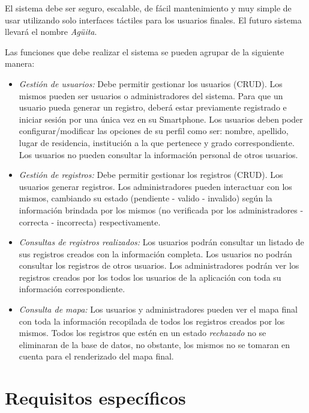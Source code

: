       El sistema debe ser seguro, escalable, de fácil mantenimiento y muy simple de usar utilizando solo interfaces táctiles para los usuarios finales. El futuro sistema llevará el nombre \emph{Agüita}.

      Las funciones que debe realizar el sistema se pueden agrupar de la siguiente manera:

      \begin{itemize}

        \item \emph{Gestión de usuarios:} Debe permitir gestionar los usuarios (CRUD). Los mismos pueden ser usuarios o administradores del sistema.
        Para que un usuario pueda generar un registro, deberá estar previamente registrado e iniciar sesión por una única vez en su Smartphone.
        Los usuarios deben poder configurar/modificar las opciones de su perfil como ser: nombre, apellido, lugar de residencia, institución a la que pertenece y grado correspondiente.
        Los usuarios no pueden consultar la información personal de otros usuarios.

        \item \emph{Gestión de registros:} Debe permitir gestionar los registros (CRUD). Los usuarios generar registros. Los administradores pueden interactuar con los mismos, cambiando su estado (pendiente - valido - invalido) según la información brindada por los mismos (no verificada por los administradores - correcta - incorrecta) respectivamente.

        \item \emph{Consultas de registros realizados:} Los usuarios podrán consultar un listado de sus registros creados con la información completa.
        Los usuarios no podrán consultar los registros de otros usuarios.
        Los administradores podrán ver los registros creados por los todos los usuarios de la aplicación con toda su información correspondiente.

        \item \emph{Consulta de mapa:} Los usuarios y administradores pueden ver el mapa final con toda la información recopilada de todos los registros creados por los mismos.
        Todos los registros que estén en un estado \emph{rechazado} no se eliminaran de la base de datos, no obstante, los mismos no se tomaran en cuenta para el renderizado del mapa final. 

      \end{itemize}
      \newpage 
  \section{Requisitos específicos}

